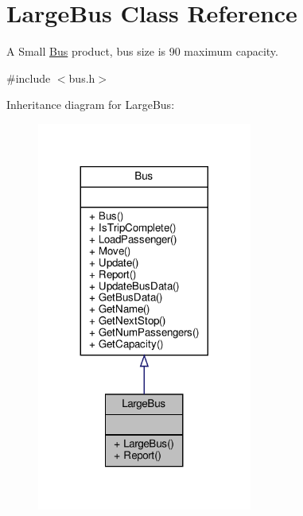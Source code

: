 \hypertarget{classLargeBus}{}\section{Large\+Bus Class Reference}
\label{classLargeBus}


A Small \hyperlink{classBus}{Bus} product, bus size is 90 maximum capacity.  




{\ttfamily \#include $<$bus.\+h$>$}



Inheritance diagram for Large\+Bus\+:\nopagebreak
\begin{figure}[H]
\begin{center}
\leavevmode
\includegraphics[width=200pt]{classLargeBus__inherit__graph}
\end{center}
\end{figure}


